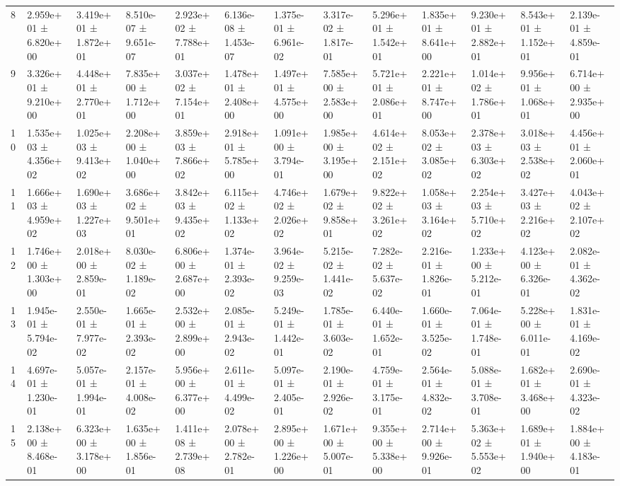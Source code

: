 \begin{table}
\begin{tabular}{lllllllllllll}
8 & 2.959e+01 ± 6.820e+00 & 3.419e+01 ± 1.872e+01 & 8.510e-07 ± 9.651e-07 & 2.923e+02 ± 7.788e+01 & 6.136e-08 ± 1.453e-07 & 1.375e-01 ± 6.961e-02 & 3.317e-02 ± 1.817e-01 & 5.296e+01 ± 1.542e+01 & 1.835e+01 ± 8.641e+00 & 9.230e+01 ± 2.882e+01 & 8.543e+01 ± 1.152e+01 & 2.139e-01 ± 4.859e-01 \\
9 & 3.326e+01 ± 9.210e+00 & 4.448e+01 ± 2.770e+01 & 7.835e+00 ± 1.712e+00 & 3.037e+02 ± 7.154e+01 & 1.478e+01 ± 2.408e+00 & 1.497e+01 ± 4.575e+00 & 7.585e+00 ± 2.583e+00 & 5.721e+01 ± 2.086e+01 & 2.221e+01 ± 8.747e+00 & 1.014e+02 ± 1.786e+01 & 9.956e+01 ± 1.068e+01 & 6.714e+00 ± 2.935e+00 \\
10 & 1.535e+03 ± 4.356e+02 & 1.025e+03 ± 9.413e+02 & 2.208e+00 ± 1.040e+00 & 3.859e+03 ± 7.866e+02 & 2.918e+01 ± 5.785e+00 & 1.091e+00 ± 3.794e-01 & 1.985e+00 ± 3.195e+00 & 4.614e+02 ± 2.151e+02 & 8.053e+02 ± 3.085e+02 & 2.378e+03 ± 6.303e+02 & 3.018e+03 ± 2.538e+02 & 4.456e+01 ± 2.060e+01 \\
11 & 1.666e+03 ± 4.959e+02 & 1.690e+03 ± 1.227e+03 & 3.686e+02 ± 9.501e+01 & 3.842e+03 ± 9.435e+02 & 6.115e+02 ± 1.133e+02 & 4.746e+02 ± 2.026e+02 & 1.679e+02 ± 9.858e+01 & 9.822e+02 ± 3.261e+02 & 1.058e+03 ± 3.164e+02 & 2.254e+03 ± 5.710e+02 & 3.427e+03 ± 2.216e+02 & 4.043e+02 ± 2.107e+02 \\
12 & 1.746e+00 ± 1.303e+00 & 2.018e+00 ± 2.859e-01 & 8.030e-02 ± 1.189e-02 & 6.806e+00 ± 2.687e+00 & 1.374e-01 ± 2.393e-02 & 3.964e-02 ± 9.259e-03 & 5.215e-02 ± 1.441e-02 & 7.282e-02 ± 5.637e-02 & 2.216e-01 ± 1.826e-01 & 1.233e+00 ± 5.212e-01 & 4.123e+00 ± 6.326e-01 & 2.082e-01 ± 4.362e-02 \\
13 & 1.945e-01 ± 5.794e-02 & 2.550e-01 ± 7.977e-02 & 1.665e-01 ± 2.393e-02 & 2.532e+00 ± 2.899e+00 & 2.085e-01 ± 2.943e-02 & 5.249e-01 ± 1.442e-01 & 1.785e-01 ± 3.603e-02 & 6.440e-01 ± 1.652e-01 & 1.660e-01 ± 3.525e-02 & 7.064e-01 ± 1.748e-01 & 5.228e+00 ± 6.011e-01 & 1.831e-01 ± 4.169e-02 \\
14 & 4.697e-01 ± 1.230e-01 & 5.057e-01 ± 1.994e-01 & 2.157e-01 ± 4.008e-02 & 5.956e+00 ± 6.377e+00 & 2.611e-01 ± 4.499e-02 & 5.097e-01 ± 2.405e-01 & 2.190e-01 ± 2.926e-02 & 4.759e-01 ± 3.175e-01 & 2.564e-01 ± 4.832e-02 & 5.088e-01 ± 3.708e-01 & 1.682e+01 ± 3.468e+00 & 2.690e-01 ± 4.323e-02 \\
15 & 2.138e+00 ± 8.468e-01 & 6.323e+00 ± 3.178e+00 & 1.635e+00 ± 1.856e-01 & 1.411e+08 ± 2.739e+08 & 2.078e+00 ± 2.782e-01 & 2.895e+00 ± 1.226e+00 & 1.671e+00 ± 5.007e-01 & 9.355e+00 ± 5.338e+00 & 2.714e+00 ± 9.926e-01 & 5.363e+02 ± 5.553e+02 & 1.689e+01 ± 1.940e+00 & 1.884e+00 ± 4.183e-01 \\

\end{tabular}
\end{table}
